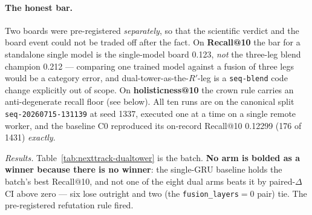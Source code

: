 \documentclass[11pt]{article}
\newcommand{\dsid}[1]{\texttt{\small #1}}
\newcommand{\Rp}{\ensuremath{R'}}
\begin{document}
\paragraph{The honest bar.} Two boards were pre-registered \emph{separately}, so
that the scientific verdict and the board event could not be traded off after the
fact. On \textbf{Recall@10} the bar for a standalone single model is the
single-model board \num{0.123}, \emph{not} the three-leg blend champion
\num{0.212} --- comparing one trained model against a fusion of three legs would
be a category error, and dual-tower-as-the-\Rp-leg is a \texttt{seq-blend} code
change explicitly out of scope. On \textbf{holisticness@10} the crown rule
carries an anti-degenerate recall floor (see below). All ten runs are on the
canonical split \dsid{seq-20260715-131139} at seed 1337, executed one at a time
on a single remote worker, and the baseline C0 reproduced its on-record
Recall@10 \num{0.12299} (\num{176} of \num{1431}) \emph{exactly}.

\emph{Results.} Table~\ref{tab:nexttrack-dualtower} is the batch. \textbf{No arm is bolded
as a winner because there is no winner}: the single-GRU baseline holds the
batch's best Recall@10, and not one of the eight dual arms beats it by
paired-$\Delta$ CI above zero --- six lose outright and two (the
\texttt{fusion\_layers}${}=0$ pair) tie. The pre-registered refutation rule
fired.
\end{document}
